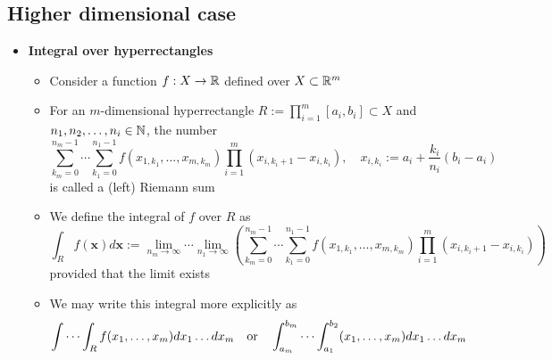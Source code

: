 \documentclass[12pt,a4paper]{article}
\begin{document}
\subsection{Higher dimensional case}

\begin{itemize}

\item \textbf{Integral over hyperrectangles}
  \begin{itemize}
  \item Consider a function $f:X \to \mathbb{R}$ defined over $X\subset \mathbb{R}^{m}$
  \item For an $m$-dimensional hyperrectangle $R:=\prod_{i=1}^{m}[a_{i}, b_{i}]\subset X$ and $n_{1},n_{2},\ldots, n_{i}\in \mathbb{N}$,
    the number
    \begin{equation}\nonumber%
      \sum_{k_{m}=0}^{n_{m}-1}\cdots\sum_{k_{1}=0}^{n_{1}-1}f(x_{1,k_{1}},\ldots, x_{m,k_{m}})\prod_{i=1}^{m}(x_{i,k_{i}+1}-x_{i,k_{i}}),
      \quad x_{i,k_{i}}:= a_{i} + \frac{k_{i}}{n_{i}}(b_{i}-a_{i})
    \end{equation}
    is called a (left) Riemann sum
  \item We define the integral of $f$ over $R$ as
    \begin{equation}\nonumber%
      \int_{R}f(\bm{x})d\bm{x} := \lim_{n_{m}\to \infty}\cdots\lim_{n_{1}\to \infty}
      \left(\sum_{k_{m}=0}^{n_{m}-1}\cdots\sum_{k_{1}=0}^{n_{1}-1}f(x_{1,k_{1}},\ldots, x_{m,k_{m}})\prod_{i=1}^{m}(x_{i,k_{i}+1}-x_{i,k_{i}})\right)
    \end{equation}
    provided that the limit exists
  \item We may write this integral more explicitly as
    \begin{equation}\nonumber%
      \idotsint_{R}f(x_{1},\ldots, x_{m})dx_{1}\ldots dx_{m}
      \quad\text{or}\quad
      \int_{a_{m}}^{b_{m}}\cdots\int_{a_{1}}^{b_{2}}(x_{1},\ldots, x_{m})dx_{1}\ldots dx_{m}
    \end{equation}
  \end{itemize}


\end{itemize}
\end{document}
